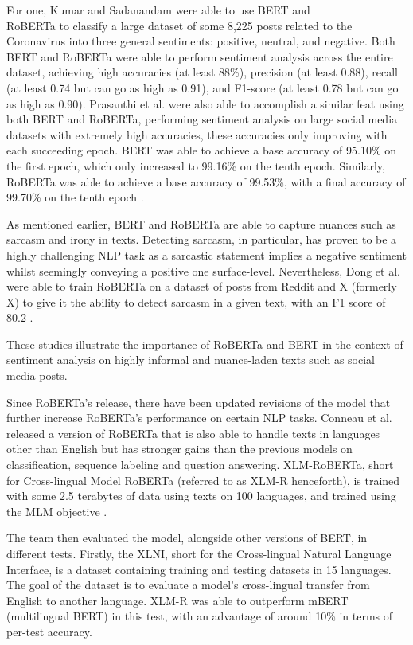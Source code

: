 For one, Kumar and Sadanandam \cite{Kumar-2023} were able to use BERT and\\
RoBERTa to classify a large dataset of some 8,225 posts related to the Coronavirus into three general sentiments: positive, neutral, and negative. Both BERT and RoBERTa were able to perform sentiment analysis across the entire dataset, achieving high accuracies (at least 88\%), precision (at least 0.88), recall (at least 0.74 but can go as high as 0.91), and F1-score (at least 0.78 but can go as high as 0.90). Prasanthi et al. \cite{Prasanthi-2023} were also able to accomplish a similar feat using both BERT and RoBERTa, performing sentiment analysis on large social media datasets with extremely high accuracies, these accuracies only improving with each succeeding epoch. BERT was able to achieve a base accuracy of 95.10\% on the first epoch, which only increased to 99.16\% on the tenth epoch. Similarly, RoBERTa was able to achieve a base accuracy of 99.53\%, with a final accuracy of 99.70\% on the tenth epoch \cite{Prasanthi-2023}.

As mentioned earlier, BERT and RoBERTa are able to capture nuances such as sarcasm and irony in texts. Detecting sarcasm, in particular, has proven to be a highly challenging NLP task as a sarcastic statement implies a negative sentiment whilst seemingly conveying a positive one surface-level. Nevertheless, Dong et al. were able to train RoBERTa on a dataset of posts from Reddit and X (formerly X) to give it the ability to detect sarcasm in a given text, with an F1 score of 80.2 \cite{Dong-2020}.

These studies illustrate the importance of RoBERTa and BERT in the context of sentiment analysis on highly informal and nuance-laden texts such as social media posts. 

Since RoBERTa’s release, there have been updated revisions of the model that further increase RoBERTa’s performance on certain NLP tasks. Conneau et al. \cite{Conneau-2020} released a version of RoBERTa that is also able to handle texts in languages other than English but has stronger gains than the previous models on classification, sequence labeling and question answering. XLM-RoBERTa, short for Cross-lingual Model RoBERTa (referred to as XLM-R henceforth), is trained with some 2.5 terabytes of data using texts on 100 languages, and trained using the MLM objective \cite{Conneau-2020}.

The team then evaluated the model, alongside other versions of BERT, in different tests. Firstly, the XLNI, short for the Cross-lingual Natural Language Interface, is a dataset containing training and testing datasets in 15 languages. The goal of the dataset is to evaluate a model’s cross-lingual transfer from English to another language. XLM-R was able to outperform mBERT (multilingual BERT) in this test, with an advantage of around 10\% in terms of per-test accuracy.

